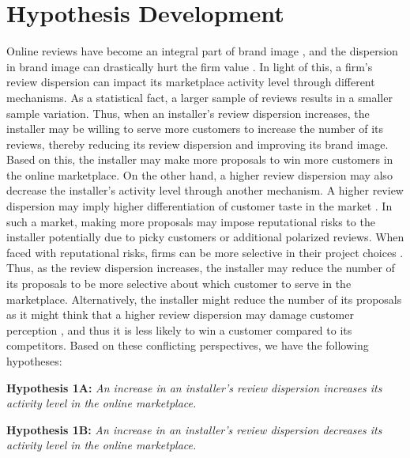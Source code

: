 \documentclass[msom,blindrev]{informs3}
\begin{document}
\section{Hypothesis Development} \label{Sec: Hypothesis}



Online reviews have become an integral part of brand image \citep{chakraborty2018credibility,chakraborty2018effects}, and the dispersion in brand image can drastically hurt the firm value \citep{luo2013impact}. In light of this, a firm's review dispersion can impact its marketplace activity level through different mechanisms. As a statistical fact, a larger sample of reviews results in a smaller sample variation. Thus, when an installer's review dispersion increases, the installer may be willing to serve more customers to increase the number of its reviews, thereby reducing its review dispersion and improving its brand image. Based on this, the installer may make more proposals to win more customers in the online marketplace. On the other hand, a higher review dispersion may also decrease the installer's activity level through another mechanism. A higher review dispersion may imply higher differentiation of customer taste in the market \citep{clemons2006online}. In such a market, making more proposals may impose reputational risks to the installer potentially due to picky customers or additional polarized reviews. When faced with reputational risks, firms can be more selective in their project choices \citep{demirag2011risks,hirshleifer1992managerial}. Thus, as the review dispersion increases, the installer may reduce the number of its proposals to be more selective about which customer to serve in the marketplace. Alternatively, the installer might reduce the number of its proposals as it might think that a higher review dispersion may damage customer perception \citep{Zhu}, and thus it is less likely to win a customer compared to its competitors. Based on these conflicting perspectives, we have the following hypotheses:


\noindent\textbf{Hypothesis 1A:} \emph{An increase in an installer's review dispersion increases its activity level in the online marketplace.}

\noindent\textbf{Hypothesis 1B:} \emph{An increase in an installer's review dispersion decreases its activity level in the online marketplace.}
\end{document}
